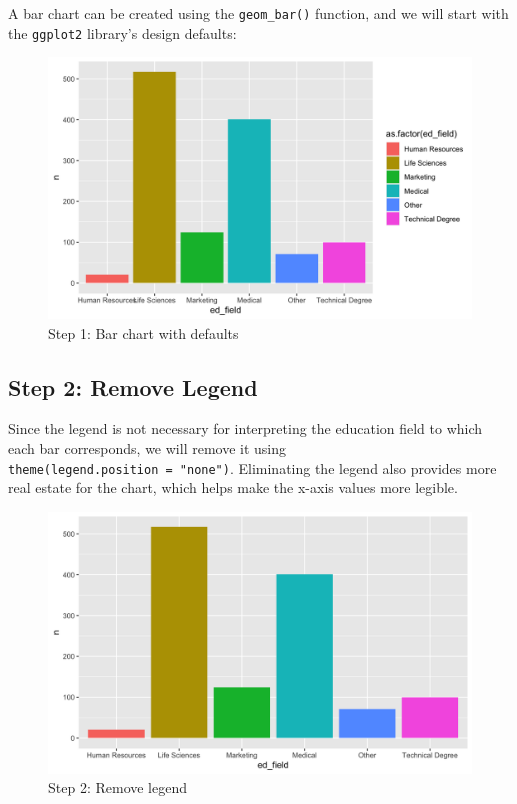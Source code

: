 \documentclass[
]{book}
\begin{document}
A bar chart can be created using the \texttt{geom\_bar()} function, and we will start with the \texttt{ggplot2} library's design defaults:

\begin{figure}

{\centering \includegraphics[width=1\linewidth]{graphics/viz_step_1} 

}

\caption{Step 1: Bar chart with defaults}\label{fig:barchart-1}
\end{figure}

\hypertarget{step-2-remove-legend}{%
\subsection{Step 2: Remove Legend}\label{step-2-remove-legend}}

Since the legend is not necessary for interpreting the education field to which each bar corresponds, we will remove it using \texttt{theme(legend.position\ =\ "none")}. Eliminating the legend also provides more real estate for the chart, which helps make the x-axis values more legible.

\begin{figure}

{\centering \includegraphics[width=1\linewidth]{graphics/viz_step_2} 

}

\caption{Step 2: Remove legend}\label{fig:barchart-2}
\end{figure}
\end{document}
